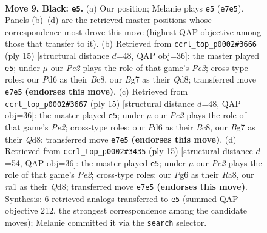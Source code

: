 \documentclass[11pt]{article}
\begin{document}
\clearpage

\begin{figure}[p]\centering
\begin{subfigure}{0.46\textwidth}\centering
\resizebox{\linewidth}{!}{%
\newchessgame
\chessboard[
  setfen={r1b1qrk1/pp1nppbp/2pp1np1/8/1PPPP2P/2N2NP1/P4PB1/R1BQK2R b KQ - 0 9},
  showmover=false,
  pgfstyle=straightmove, color=movearrow, markmove={e7-e5}
]}
\caption{}
\end{subfigure}\hfill
\begin{subfigure}{0.46\textwidth}\centering
\resizebox{\linewidth}{!}{%
\newchessgame
\chessboard[
  setfen={r1bq1rk1/pp1nppbp/2pp1np1/8/2PPP3/2N2NP1/PP3PBP/R1BQ1RK1 b - - 0 8},
  showmover=false,
  pgfstyle=straightmove, color=movearrow, markmove={e7-e5}
]}
\caption{}
\end{subfigure}
\\[4pt]
\begin{subfigure}{0.46\textwidth}\centering
\resizebox{\linewidth}{!}{%
\newchessgame
\chessboard[
  setfen={r1bq1rk1/pp1nppbp/2pp1np1/8/2PPP3/2N2NP1/PP3PBP/R1BQ1RK1 b - - 0 8},
  showmover=false,
  pgfstyle=straightmove, color=movearrow, markmove={e7-e5}
]}
\caption{}
\end{subfigure}\hfill
\begin{subfigure}{0.46\textwidth}\centering
\resizebox{\linewidth}{!}{%
\newchessgame
\chessboard[
  setfen={r1bq1rk1/pp1nppbp/2pp1np1/8/2PPP3/2NB1N2/PP3PPP/R1BQR1K1 b - - 3 8},
  showmover=false,
  pgfstyle=straightmove, color=movearrow, markmove={e7-e5}
]}
\caption{}
\end{subfigure}
\caption{\textbf{Move 9, Black: \texttt{e5}.} (a) Our position; Melanie plays \texttt{e5} (\texttt{e7e5}). Panels (b)--(d) are the retrieved master positions whose correspondence most drove this move (highest QAP objective among those that transfer to it). (b) Retrieved from \texttt{ccrl\_top\_p0002\#3666} (ply 15) [structural distance $d$=48, QAP obj=36]: the master played \texttt{e5}; under $\mu$ our \emph{Pe2} plays the role of that game's \emph{Pe2}; cross-type roles: our \emph{P}d6 as their \emph{B}c8, our \emph{B}g7 as their \emph{Q}d8; transferred move \texttt{e7e5} \textbf{(endorses this move)}. (c) Retrieved from \texttt{ccrl\_top\_p0002\#3667} (ply 15) [structural distance $d$=48, QAP obj=36]: the master played \texttt{e5}; under $\mu$ our \emph{Pe2} plays the role of that game's \emph{Pe2}; cross-type roles: our \emph{P}d6 as their \emph{B}c8, our \emph{B}g7 as their \emph{Q}d8; transferred move \texttt{e7e5} \textbf{(endorses this move)}. (d) Retrieved from \texttt{ccrl\_top\_p0002\#3435} (ply 15) [structural distance $d$=54, QAP obj=36]: the master played \texttt{e5}; under $\mu$ our \emph{Pe2} plays the role of that game's \emph{Pe2}; cross-type roles: our \emph{P}g6 as their \emph{R}a8, our \emph{r}a1 as their \emph{Q}d8; transferred move \texttt{e7e5} \textbf{(endorses this move)}. Synthesis: 6 retrieved analogs transferred to \texttt{e5} (summed QAP objective 212, the strongest correspondence among the candidate moves); Melanie committed it via the \texttt{search} selector.}
\label{fig:thought-m17}
\end{figure}
\end{document}
